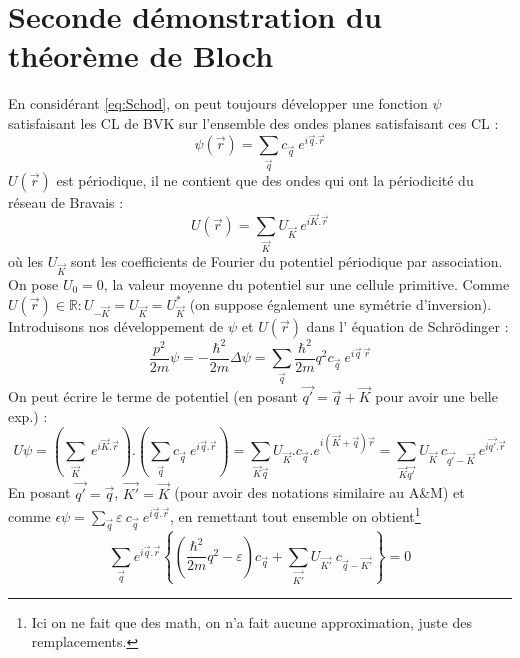 	\section{Seconde démonstration du théorème de Bloch}
	En considérant \autoref{eq:Schod}, on peut toujours développer 
	une fonction $\psi$ satisfaisant les CL de BVK sur l'ensemble 
	des ondes planes satisfaisant ces CL :
	\begin{equation}
	\psi(\vec{r}) = \sum_{\vec{q}} c_{\vec{q}}\ e^{i\vec{q}.\vec{r}}
	\end{equation}
	$U(\vec{r})$ est périodique, il ne contient que des ondes qui 
	ont la périodicité du réseau de Bravais :
	\begin{equation}
	U(\vec{r}) = \sum_{\vec{K}} U_{\vec{K}}\ e^{i\vec{K}.\vec{r}}
	\end{equation}
	où les $U_{\vec{K}}$ sont les coefficients de Fourier du potentiel 
	périodique par association. On pose $U_0=0$, la valeur moyenne 
	du potentiel sur une cellule primitive. Comme $U(\vec{r}) \in 
	\mathbb{R} : U_{-\vec{K}}=U_{\vec{K}}=U_{\vec{K}}^*$ (on suppose 
	également une symétrie d'inversion).\\
	Introduisons nos développement de $\psi$ et $U(\vec{r})$ dans l'
	équation de Schrödinger :
	\begin{equation}
	\frac{p^2}{2m}\psi = -\frac{\hbar^2}{2m}\Delta \psi = \sum_{\vec q}
	\frac{\hbar^2}{2m}q^2c_{\vec{q}}\ e^{i\vec{q}\ \vec{r}} 
	\end{equation}
	On peut écrire le terme de potentiel (en posant $\vec{q'}=\vec{q}+
	\vec{K}$ pour avoir une belle exp.) :
	\begin{equation}
	U\psi = \left(\sum_{\vec{K}}\ e^{i\vec{K}.\vec{r}}\right).\left(
	\sum_{\vec{q}} c_{\vec{q}}\ e^{i\vec{q}.\vec{r}}\right) = \sum_{
	\vec{K}\vec{q}} U_{\vec{K}}.c_{\vec{q}}.e^{i(\vec{K}+\vec{q})\vec{r}}
	= \sum_{\vec{K}\vec{q'}}U_{\vec{K}}\ c_{\vec{q'}-\vec{K}}\ e^{i
	\vec{q'}.\vec{r}}
	\end{equation}
	En posant $\vec{q'}=\vec{q}$, $\vec{K'}=\vec{K}$ (pour avoir des 
	notations similaire au A\&M) et comme $\displaystyle\epsilon\psi = 
	\sum_{\vec{q}} 	\varepsilon\ c_{\vec{q}}\ e^{i\vec{q}.\vec{r}} $, 
	en remettant tout ensemble on obtient\footnote{Ici on ne fait que 
	des math, on n'a fait aucune approximation, juste des remplacements.}
	\begin{equation}
	\sum_{\vec{q}}e^{i\vec{q}.\vec{r}}\left\{\left(\frac{\hbar^2}{2m}q^2
	-\varepsilon\right)c_{\vec{q}} + \sum_{\vec{K'}}U_{\vec{K'}}\ c_{\vec{
	q}-\vec{K'}}\right\}=0
	\end{equation}
